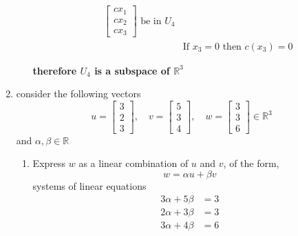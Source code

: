 \documentclass[11pt]{article}
\begin{document}
\begin{enumerate}
\begin{enumerate}
\begin{enumerate}
\[\begin{aligned}
\begin{bmatrix}
                cx_1 \\
                cx_2 \\
                cx_3
            \end{bmatrix} \text{ be in } U_4 \\
            &\text{If } x_3 = 0 \text{ then } c(x_3) = 0
        \end{aligned}
        \]
    \end{enumerate}
    \textbf{therefore \( U_4 \) is a subspace of \( \mathbb{R}^3 \)}
\end{enumerate}
\item consider the following vectors \[
u = \begin{bmatrix}
3 \\
2 \\
3
\end{bmatrix}, \quad
v = \begin{bmatrix}
5 \\
3 \\
4
\end{bmatrix}, \quad
w = \begin{bmatrix}
3 \\
3 \\
6
\end{bmatrix} \in \mathbb{R}^3
\]
and
\(\alpha, \beta \in \mathbb{R}\)

\begin{enumerate}
    \item Express \( w \) as a linear combination of \( u \) and \( v \), of the form,
    \[ w = \alpha u + \beta v \]
systems of linear equations
\[
\begin{aligned}
    3\alpha + 5\beta &= 3 \\
    2\alpha + 3\beta &= 3 \\
    3\alpha + 4\beta &= 6
\end{aligned}
\]


\end{enumerate}
\end{enumerate}
\end{document}
